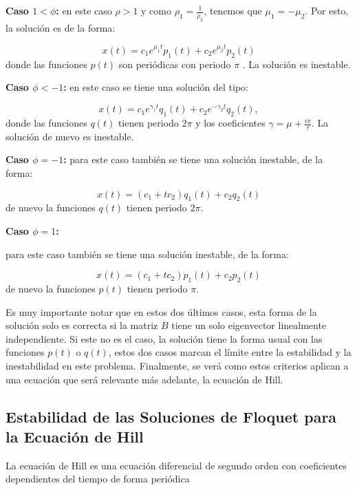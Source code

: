 \documentclass[10pt,a4paper]{report}
\begin{document}
\textbf{Caso $1 < \phi$:} en este caso $\rho > 1$ y como $\rho_1 = \frac{1}{\rho_2}$, tenemos que $\mu_1 = -\mu_2$. Por esto, la solución es de la forma:

\begin{equation}
x(t) = c_1 e^{\mu_1 t}p_1(t) + c_2 e^{\mu_2 t}p_2(t)
\end{equation} donde las funciones $p(t)$ son periódicas con periodo $\pi$ .
La solución es inestable.

\textbf{Caso $\phi < -1$:} en este caso se tiene una solución del
tipo:

\begin{equation}
x(t) =c_1 e^{\gamma_1 t}q_1(t) + c_2 e^{-\gamma_2 t}q_2(t),
\end{equation} donde las funciones $q(t)$ tienen periodo $2\pi$ y los coeficientes $\gamma = \mu + \frac{i\pi}{\tau}$. La solución de nuevo es inestable.

\textbf{Caso $\phi = -1$:} para este caso también se tiene una
solución inestable, de la forma:

\begin{equation}
x(t) = (c_1 + tc_2)q_1(t) + c_2q_2(t)
\end{equation} de nuevo la funciones $q(t)$ tienen periodo $2\pi$.

\textbf{Caso $\phi = 1$:}

para este caso también se tiene una solución inestable, de la forma:

\begin{equation}
x(t) = (c_1 + tc_2)p_1(t) + c_2p_2(t)
\end{equation} de nuevo la funciones $p(t)$ tienen periodo $\pi$.

Es muy importante notar que en estos dos últimos casos, esta forma de la solución solo es correcta si la matriz $B$ tiene un solo eigenvector linealmente independiente. Si este no es el caso, la solución tiene la forma usual con las funciones $p(t)$ o $q(t)$, estos dos casos marcan el límite entre la estabilidad y la inestabilidad en este problema. Finalmente, se verá como estos criterios aplican a una ecuación que será relevante más adelante, la ecuación de Hill.

\subsection{Estabilidad de las Soluciones de Floquet para la Ecuación de Hill}

La ecuación de Hill es una ecuación diferencial de segundo orden con coeficientes dependientes del tiempo de forma periódica\cite{WardFT}
\end{document}
